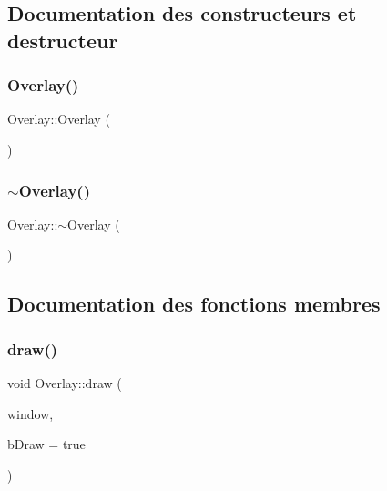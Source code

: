 \subsection{Documentation des constructeurs et destructeur}
\mbox{\label{class_overlay_ab4f509d502931bcaad03418470993d70}} 
\subsubsection{\texorpdfstring{Overlay()}{Overlay()}}
{\footnotesize\ttfamily Overlay\+::\+Overlay (\begin{DoxyParamCaption}{ }\end{DoxyParamCaption})}

\mbox{\label{class_overlay_ad40a5e109ee4acbdec9f21d5496b7fa9}} 
\subsubsection{\texorpdfstring{$\sim$\+Overlay()}{~Overlay()}}
{\footnotesize\ttfamily Overlay\+::$\sim$\+Overlay (\begin{DoxyParamCaption}{ }\end{DoxyParamCaption})}



\subsection{Documentation des fonctions membres}
\mbox{\label{class_overlay_a3fcdcd87bc909289e094ce799708a0c9}} 
\subsubsection{\texorpdfstring{draw()}{draw()}}
{\footnotesize\ttfamily void Overlay\+::draw (\begin{DoxyParamCaption}\item[{sf\+::\+Render\+Window \&}]{window,  }\item[{bool}]{b\+Draw = {\ttfamily true} }\end{DoxyParamCaption})}

\mbox{\label{class_overlay_a4a0fd28b3355bcaeb54d24641a1066e3}} 
